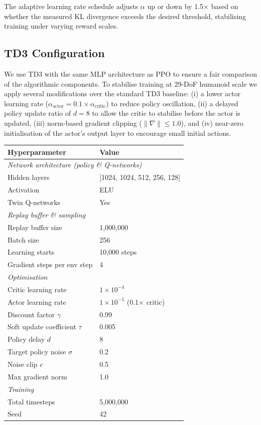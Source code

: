 \documentclass{article}
\begin{document}
The adaptive learning rate schedule adjusts $\alpha$ up or down by 1.5$\times$
based on whether the measured KL divergence exceeds the desired threshold,
stabilising training under varying reward scales.

\subsection{TD3 Configuration}

We use TD3 with the same MLP architecture as PPO to ensure a fair comparison
of the algorithmic components.
To stabilise training at 29-DoF humanoid scale we apply several modifications
over the standard TD3 baseline: (i) a lower actor learning rate
($\alpha_\text{actor} = 0.1 \times \alpha_\text{critic}$) to reduce policy
oscillation, (ii) a delayed policy update ratio of $d=8$ to allow the critic
to stabilise before the actor is updated, (iii) norm-based gradient clipping
($\|\nabla\| \leq 1.0$), and (iv) near-zero initialisation of the actor's
output layer to encourage small initial actions.

\begin{center}
\begin{tabular}{ll}
  \toprule
  \textbf{Hyperparameter} & \textbf{Value} \\
  \midrule
  \multicolumn{2}{l}{\textit{Network architecture (policy \& Q-networks)}} \\
  \quad Hidden layers & [1024, 1024, 512, 256, 128] \\
  \quad Activation & ELU \\
  \quad Twin Q-networks & Yes \\
  \midrule
  \multicolumn{2}{l}{\textit{Replay buffer \& sampling}} \\
  \quad Replay buffer size & 1{,}000{,}000 \\
  \quad Batch size & 256 \\
  \quad Learning starts & 10{,}000 steps \\
  \quad Gradient steps per env step & 4 \\
  \midrule
  \multicolumn{2}{l}{\textit{Optimisation}} \\
  \quad Critic learning rate & $1\times10^{-4}$ \\
  \quad Actor learning rate & $1\times10^{-5}$ (0.1$\times$ critic) \\
  \quad Discount factor $\gamma$ & 0.99 \\
  \quad Soft update coefficient $\tau$ & 0.005 \\
  \quad Policy delay $d$ & 8 \\
  \quad Target policy noise $\sigma$ & 0.2 \\
  \quad Noise clip $c$ & 0.5 \\
  \quad Max gradient norm & 1.0 \\
  \midrule
  \multicolumn{2}{l}{\textit{Training}} \\
  \quad Total timesteps & 5{,}000{,}000 \\
  \quad Seed & 42 \\
  \bottomrule
\end{tabular}
\end{center}
\end{document}
